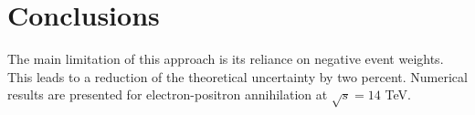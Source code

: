 \section{Conclusions}\label{sec:conclusions}

The main limitation of this approach is its reliance on negative event
weights. This leads to a reduction of the theoretical uncertainty by two
percent. Numerical results are presented for electron-positron
annihilation at $\sqrt{s} = 14$ TeV.

